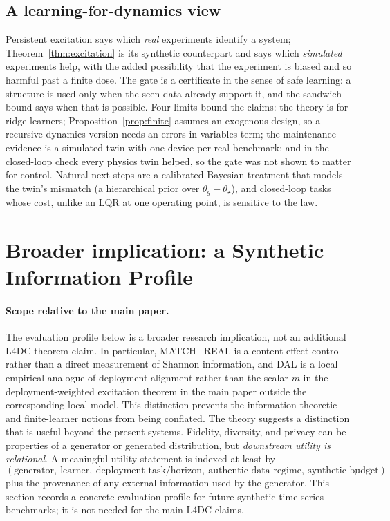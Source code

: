 \subsection{A learning-for-dynamics view}
Persistent excitation says which \emph{real} experiments identify a system; Theorem~\ref{thm:excitation} is its synthetic counterpart and says which \emph{simulated} experiments help, with the added possibility that the experiment is biased and so harmful past a finite dose. The gate is a certificate in the sense of safe learning: a structure is used only when the seen data already support it, and the sandwich bound says when that is possible. Four limits bound the claims: the theory is for ridge learners; Proposition~\ref{prop:finite} assumes an exogenous design, so a recursive-dynamics version needs an errors-in-variables term; the maintenance evidence is a simulated twin with one device per real benchmark; and in the closed-loop check every physics twin helped, so the gate was not shown to matter for control. Natural next steps are a calibrated Bayesian treatment that models the twin's mismatch (a hierarchical prior over $\theta_g-\theta_\star$), and closed-loop tasks whose cost, unlike an LQR at one operating point, is sensitive to the law.

\section{Broader implication: a Synthetic Information Profile}\label{app:evaluation-profile}

\paragraph{Scope relative to the main paper.}
The evaluation profile below is a broader research implication, not an additional L4DC theorem claim. In particular, MATCH$-$REAL is a content-effect control rather than a direct measurement of Shannon information, and DAL is a local empirical analogue of deployment alignment rather than the scalar $m$ in the deployment-weighted excitation theorem in the main paper outside the corresponding local model. This distinction prevents the information-theoretic and finite-learner notions from being conflated.
The theory suggests a distinction that is useful beyond the present systems. Fidelity, diversity, and privacy can be properties of a generator or generated distribution, but \emph{downstream utility is relational}. A meaningful utility statement is indexed at least by
\[
(\text{generator},\ \text{learner},\ \text{deployment task/horizon},\ \text{authentic-data regime},\ \text{synthetic budget}),
\]
plus the provenance of any external information used by the generator. This section records a concrete evaluation profile for future synthetic-time-series benchmarks; it is not needed for the main L4DC claims.

